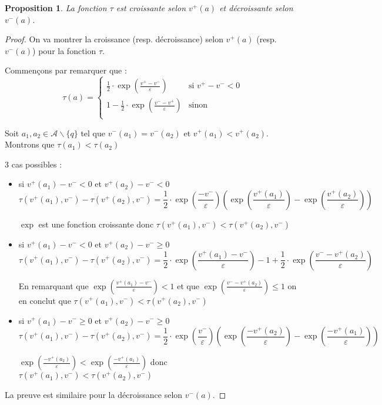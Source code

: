 \documentclass[11pt]{article}
\newtheorem{proposition}{Proposition}[section]
\theoremstyle{defi}
\theoremstyle{not}
\theoremstyle{prob}
\begin{document}
    \begin{proposition}
      La fonction $\tau$ est croissante selon $v^+(a)$ et décroissante selon $v^-(a)$.
    \end{proposition}
    \begin{proof}
      On va montrer la croissance (resp. décroissance) selon $v^+(a)$ (resp. $v^-(a)$) pour la fonction $\tau$.

      Commençons par remarquer que :
      $$\tau(a) = \left\{
        \begin{array}{ll}
          \frac{1}{2} \cdot \exp(\frac{v^+ - v^-}{\varepsilon})  & \mbox{si } v^+ - v^- < 0 \\
          1 - \frac{1}{2} \cdot \exp(\frac{v^- - v^+}{\varepsilon}) & \mbox{sinon} \\
        \end{array}
      \right.$$

      Soit $a_1, a_2 \in \mathcal{A}\backslash \{q\}$ tel que $v^-(a_1) = v^-(a_2)$ et $v^+(a_1) < v^+(a_2)$. Montrons que $\tau(a_1) < \tau(a_2)$

      3 cas possibles :
      \begin{itemize}
        \item si $v^+(a_1) - v^- < 0$ et $v^+(a_2) - v^- < 0$
        $$\tau(v^+(a_1), v^-) - \tau(v^+(a_2), v^-) = \frac{1}{2} \cdot \exp(\frac{- v^-}{\varepsilon})(\exp(\frac{v^+(a_1)}{\varepsilon}) - \exp(\frac{v^+(a_2)}{\varepsilon}))$$

        $\exp$ est une fonction croissante donc $\tau(v^+(a_1), v^-) < \tau(v^+(a_2), v^-)$

        \item si $v^+(a_1) - v^- < 0$ et $v^+(a_2) - v^- \geq 0$
        $$\tau(v^+(a_1), v^-) - \tau(v^+(a_2), v^-) = \frac{1}{2} \cdot \exp(\frac{v^+(a_1) - v^-}{\varepsilon}) - 1 + \frac{1}{2} \cdot \exp(\frac{v^- - v^+(a_2)}{\varepsilon})$$

        En remarquant que $\exp(\frac{v^+(a_1) - v^-}{\varepsilon}) < 1$ et que $\exp(\frac{v^- - v^+(a_2)}{\varepsilon}) \leq 1$ on en conclut que $\tau(v^+(a_1), v^-) < \tau(v^+(a_2), v^-)$

        \item si $v^+(a_1) - v^- \geq 0$ et $v^+(a_2) - v^- \geq 0$
        $$\tau(v^+(a_1), v^-) - \tau(v^+(a_2), v^-) = \frac{1}{2} \cdot \exp(\frac{v^-}{\varepsilon})(\exp(\frac{- v^+(a_2)}{\varepsilon}) - \exp(\frac{- v^+(a_1)}{\varepsilon}))$$

        $\exp(\frac{- v^+(a_2)}{\varepsilon}) < \exp(\frac{- v^+(a_1)}{\varepsilon})$ donc $\tau(v^+(a_1), v^-) < \tau(v^+(a_2), v^-)$
      \end{itemize}

      La preuve est similaire pour la décroissance selon $v^-(a)$.
    \end{proof}
\end{document}

